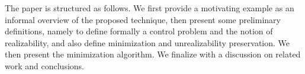 The paper is structured as follows. We first provide a motivating example as an informal 
overview of the proposed technique, then present some preliminary definitions, 
namely to define formally a control problem and the notion of realizability, and also define minimization and unrealizability preservation. We then present the minimization algorithm. We finalize with a discussion on 
related work and conclusions.
%
%
%
%
%
%
